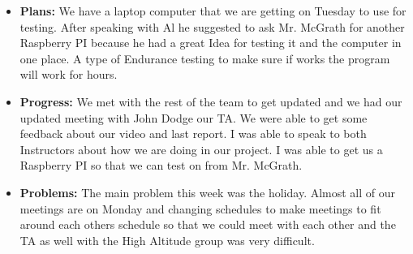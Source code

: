 \documentclass[10pt,draftclsnofoot,onecolumn]{IEEEtran}
\begin{document}
\begin{itemize}
	\item \textbf{Plans: }
	We have a laptop computer that we are getting on Tuesday to use for testing. After speaking with Al he suggested to ask Mr. McGrath for another Raspberry PI because he had a great Idea for testing it and the computer in one place. A type of Endurance testing to make sure if works the program will work for hours.
	\item \textbf{Progress: }
	We met with the rest of the team to get updated and we had our updated meeting with John Dodge our TA. We were able to get some feedback about our video and last report. I was able to speak to both Instructors about how we are doing in our project. I was able to get us a Raspberry PI so that we can test on from Mr. McGrath.
	\item \textbf{Problems: }
	The main problem this week was the holiday. Almost all of our meetings are on Monday and changing schedules to make meetings to fit around each others schedule so that we could meet with each other and the TA as well with the High Altitude group was very difficult.
\end{itemize}
\end{document}
